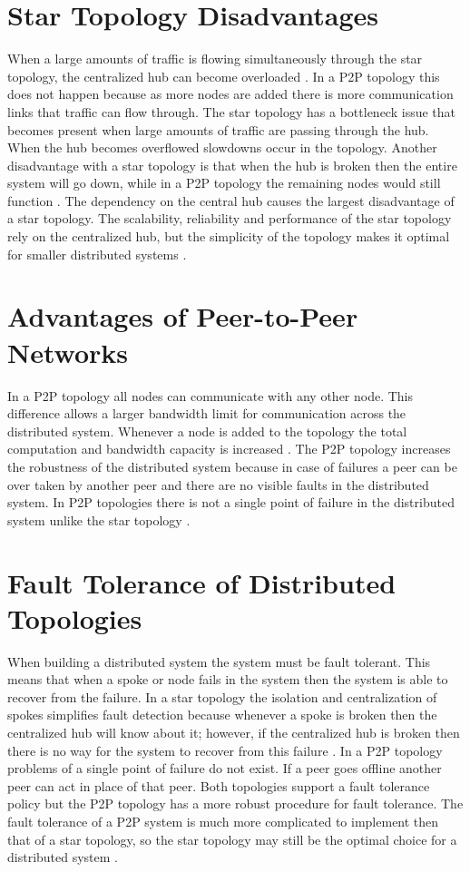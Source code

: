 \documentclass[12pt]{report}
\begin{document}
\section{Star Topology Disadvantages}
When a large amounts of traffic is flowing simultaneously through the star topology, the centralized hub can become overloaded \cite{StarAdvantages}.  In a P2P topology this does not happen because as more nodes are added there is more communication links that traffic can flow through.  The star topology has a bottleneck issue that becomes present when large amounts of traffic are passing through the hub.  When the hub becomes overflowed slowdowns occur in the topology.  Another disadvantage with a star topology is that when the hub is broken then the entire system will go down, while in a P2P topology the remaining nodes would still function \cite{StarAdvantages}.  The dependency on the central hub causes the largest disadvantage of a star topology.  The scalability, reliability and performance of the star topology rely on the centralized hub, but the simplicity of the topology makes it optimal for smaller distributed systems \cite{StarAdvantages}.

\section{Advantages of Peer-to-Peer Networks}
In a P2P topology all nodes can communicate with any other node.  This difference allows a larger bandwidth limit for communication across the distributed system.  Whenever a node is added to the topology the total computation and bandwidth capacity is increased \cite{P2PAdvantages}.  The P2P topology increases the robustness of the distributed system because in case of failures a peer can be over taken by another peer and there are no visible faults in the distributed system.  In P2P topologies there is not a single point of failure in the distributed system unlike the star topology \cite{P2PAdvantages}.

\section{Fault Tolerance of Distributed Topologies}

When building a distributed system the system must be fault tolerant.  This means that when a spoke or node fails in the system then the system is able to recover from the failure.  In a star topology the isolation and centralization of spokes simplifies fault detection because whenever a spoke is broken then the centralized hub will know about it; however, if the centralized hub is broken then there is no way for the system to recover from this failure \cite{StarAdvantages}.  In a P2P topology problems of a single point of failure do not exist.  If a peer goes offline another peer can act in place of that peer.  Both topologies support a fault tolerance policy but the P2P topology has a more robust procedure for fault tolerance.  The fault tolerance of a P2P system is much more complicated to implement then that of a star topology, so the star topology may still be the optimal choice for a distributed system \cite{Fallacies}. 
\end{document}
